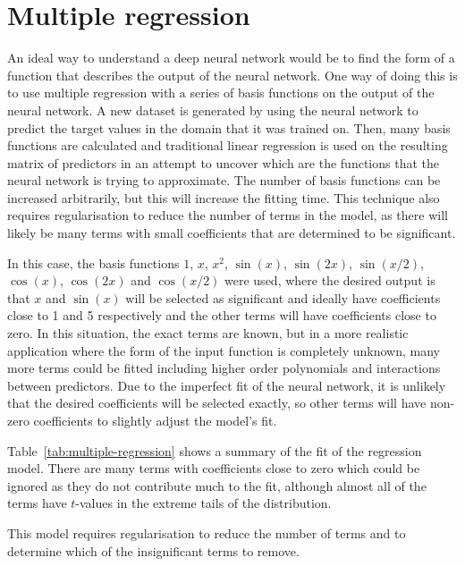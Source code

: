 \section{Multiple regression} \label{sec:multiple-regression}

An ideal way to understand a deep neural network would be to find the form of a function that describes the output of the neural network.
One way of doing this is to use multiple regression with a series of basis functions on the output of the neural network.
A new dataset is generated by using the neural network to predict the target values in the domain that it was trained on.
Then, many basis functions are calculated and traditional linear regression is used on the resulting matrix of predictors in an attempt to uncover which are the  functions that the neural network is trying to approximate.
The number of basis functions can be increased arbitrarily, but this will increase the fitting time.
This technique also requires regularisation to reduce the number of terms in the model, as there will likely be many terms with small coefficients that are determined to be significant.

In this case, the basis functions \(1\), \(x\), \(x^2\), \(\sin(x)\), \(\sin(2x)\), \(\sin(x/2)\), \(\cos(x)\), \(\cos(2x)\) and \(\cos(x/2)\) were used, where the desired output is that \(x\) and \(\sin(x)\) will be selected as significant and ideally have coefficients close to 1 and 5 respectively and the other terms will have coefficients close to zero.
In this situation, the exact  terms are known, but in a more realistic application where the form of the input function is completely unknown, many more terms could be fitted including higher order polynomials and interactions between predictors.
Due to the imperfect fit of the neural network, it is unlikely that the desired coefficients will be selected exactly, so other terms will have non-zero coefficients to slightly adjust the model's fit.

Table~\ref{tab:multiple-regression} shows a summary of the fit of the regression model.
There are many terms with coefficients close to zero which could be ignored as they do not contribute much to the fit, although almost all of the terms have \(t\)-values in the extreme tails of the distribution.


This model requires regularisation to reduce the number of terms and to determine which of the insignificant terms to remove.

